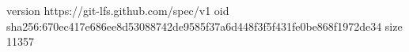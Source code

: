 version https://git-lfs.github.com/spec/v1
oid sha256:670ec417e686ee8d53088742de9585f37a6d448f3f5f431fe0be868f1972de34
size 11357
